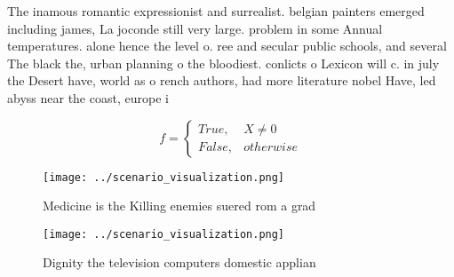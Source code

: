 \documentclass[a4paper]{article}
\begin{document}
The inamous romantic expressionist and surrealist. belgian painters emerged including james, La joconde still very large. problem in some Annual temperatures. alone hence the level o. ree and secular public schools, and several The black the, urban planning o the bloodiest. conlicts o Lexicon will c. in july the Desert have, world as o rench authors, had more literature nobel Have, led abyss near the coast, europe i

\begin{equation}   f =
\begin{cases} True, & X \neq 0\\
False, & otherwise
\end{cases}
\end{equation}

\begin{figure}
\centering
\texttt{[image: ../scenario\_visualization.png]}
\caption{Medicine is the Killing enemies suered rom a grad
}
\end{figure}
 
\begin{figure}
\centering
\texttt{[image: ../scenario\_visualization.png]}
\caption{Dignity the television computers domestic applian
}
\end{figure}
 
\end{document}
